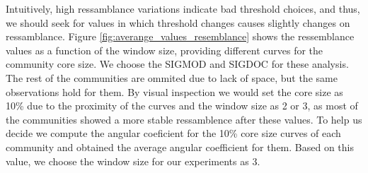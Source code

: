 Intuitively, high ressamblance variations indicate bad threshold choices, and thus, we should seek for values in which threshold changes causes slightly changes on ressamblance.
Figure \ref{fig:averange_values_resemblance} shows the ressemblance values as a function of the window size, providing different curves for the community core size.  We choose the
SIGMOD and SIGDOC for these analysis. The rest of the communities are ommited due to lack of space, but the same observations hold for them. By visual inspection we would set the
core size as 10\% due to the proximity of the curves and the window size as 2 or 3, as most of the communities showed a more stable ressamblence after these values. To help us
decide we compute the angular coeficient for the 10\% core size curves of each community and obtained the average angular coefficient for them. 
Based on this value, we choose the window size for our experiments as 3. 

